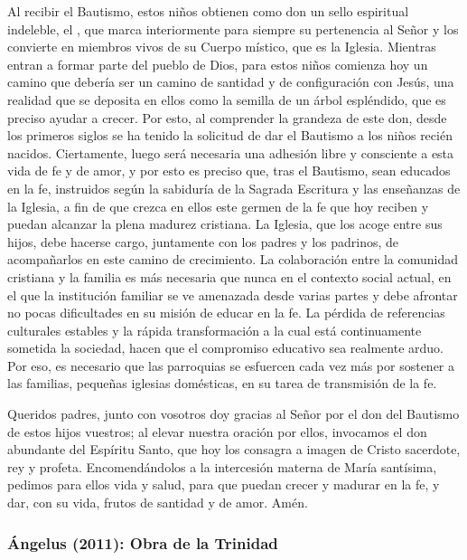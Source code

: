\begin{body}
					Al recibir el Bautismo, estos niños obtienen como don un sello espiritual indeleble, el , que marca interiormente para siempre su pertenencia al Señor y los convierte en miembros vivos de su Cuerpo místico, que es la Iglesia. Mientras entran a formar parte del pueblo de Dios, para estos niños comienza hoy un camino que debería ser un camino de santidad y de configuración con Jesús, una realidad que se deposita en ellos como la semilla de un árbol espléndido, que es preciso ayudar a crecer. Por esto, al comprender la grandeza de este don, desde los primeros siglos se ha tenido la solicitud de dar el Bautismo a los niños recién nacidos. Ciertamente, luego será necesaria una adhesión libre y consciente a esta vida de fe y de amor, y por esto es preciso que, tras el Bautismo, sean educados en la fe, instruidos según la sabiduría de la Sagrada Escritura y las enseñanzas de la Iglesia, a fin de que crezca en ellos este germen de la fe que hoy reciben y puedan alcanzar la plena madurez cristiana. La Iglesia, que los acoge entre sus hijos, debe hacerse cargo, juntamente con los padres y los padrinos, de acompañarlos en este camino de crecimiento. La colaboración entre la comunidad cristiana y la familia es más necesaria que nunca en el contexto social actual, en el que la institución familiar se ve amenazada desde varias partes y debe afrontar no pocas dificultades en su misión de educar en la fe. La pérdida de referencias culturales estables y la rápida transformación a la cual está continuamente sometida la sociedad, hacen que el compromiso educativo sea realmente arduo. Por eso, es necesario que las parroquias se esfuercen cada vez más por sostener a las familias, pequeñas iglesias domésticas, en su tarea de transmisión de la fe.
					
					Queridos padres, junto con vosotros doy gracias al Señor por el don del Bautismo de estos hijos vuestros; al elevar nuestra oración por ellos, invocamos el don abundante del Espíritu Santo, que hoy los consagra a imagen de Cristo sacerdote, rey y profeta. Encomendándolos a la intercesión materna de María santísima, pedimos para ellos vida y salud, para que puedan crecer y madurar en la fe, y dar, con su vida, frutos de santidad y de amor. Amén.
				\end{body}
			
			\subsubsection{Ángelus (2011): Obra de la Trinidad}
			
